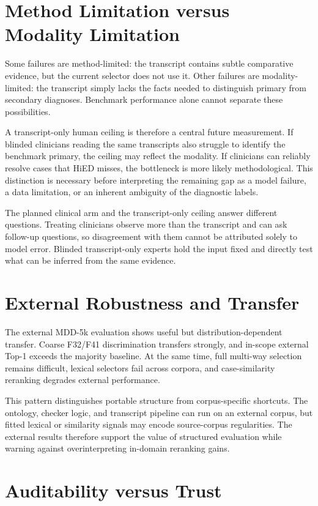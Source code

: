 \section{Method Limitation versus Modality Limitation}

Some failures are method-limited: the transcript contains subtle comparative evidence, but the current selector does not use it. Other failures are modality-limited: the transcript simply lacks the facts needed to distinguish primary from secondary diagnoses. Benchmark performance alone cannot separate these possibilities.

A transcript-only human ceiling is therefore a central future measurement. If blinded clinicians reading the same transcripts also struggle to identify the benchmark primary, the ceiling may reflect the modality. If clinicians can reliably resolve cases that HiED misses, the bottleneck is more likely methodological. This distinction is necessary before interpreting the remaining gap as a model failure, a data limitation, or an inherent ambiguity of the diagnostic labels.

The planned clinical arm and the transcript-only ceiling answer different questions. Treating clinicians observe more than the transcript and can ask follow-up questions, so disagreement with them cannot be attributed solely to model error. Blinded transcript-only experts hold the input fixed and directly test what can be inferred from the same evidence.

\section{External Robustness and Transfer}

The external MDD-5k evaluation shows useful but distribution-dependent transfer. Coarse F32/F41 discrimination transfers strongly, and in-scope external Top-1 exceeds the majority baseline. At the same time, full multi-way selection remains difficult, lexical selectors fail across corpora, and case-similarity reranking degrades external performance.

This pattern distinguishes portable structure from corpus-specific shortcuts. The ontology, checker logic, and transcript pipeline can run on an external corpus, but fitted lexical or similarity signals may encode source-corpus regularities. The external results therefore support the value of structured evaluation while warning against overinterpreting in-domain reranking gains.

\section{Auditability versus Trust}

